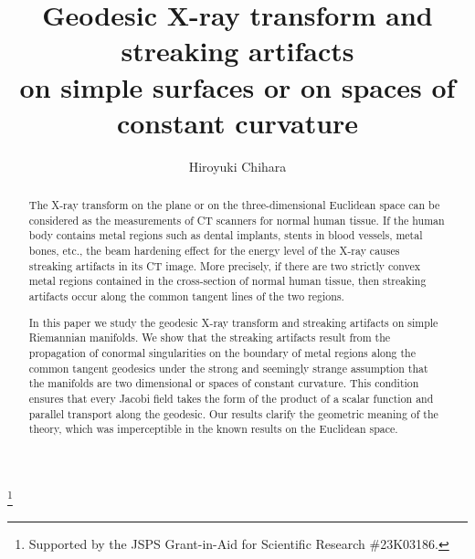 \documentclass[a4paper,11pt,reqno]{amsart}
\numberwithin{equation}{section}
\theoremstyle{definition}
\theoremstyle{remark}
\begin{document}
\title[Geodesic X-ray transform]{Geodesic X-ray transform and streaking artifacts \\ on simple surfaces or on spaces of constant curvature}
\author[H.~Chihara]{Hiroyuki Chihara}
\address{College of Education, University of the Ryukyus, Nishihara, Okinawa 903-0213, Japan}
\thanks{Supported by the JSPS Grant-in-Aid for Scientific Research \#23K03186.}
\begin{abstract}
The X-ray transform on the plane or on the three-dimensional Euclidean space can be considered as the measurements of CT scanners for normal human tissue. If the human body contains metal regions such as dental implants, stents in blood vessels, metal bones, etc., the beam hardening effect for the energy level of the X-ray causes streaking artifacts in its CT image. More precisely, if there are two strictly convex metal regions contained in the cross-section of normal human tissue, then streaking artifacts occur along the common tangent lines of the two regions.

In this paper we study the geodesic X-ray transform and streaking artifacts on simple Riemannian manifolds. We show that the streaking artifacts result from the propagation of conormal singularities on the boundary of metal regions along the common tangent geodesics under the strong and seemingly strange assumption that the manifolds are two dimensional or spaces of constant curvature. This condition ensures that every Jacobi field takes the form of the product of a scalar function and parallel transport along the geodesic. Our results clarify the geometric meaning of the theory, which was imperceptible in the known results on the Euclidean space. 
\end{abstract}
\maketitle
\end{document}
